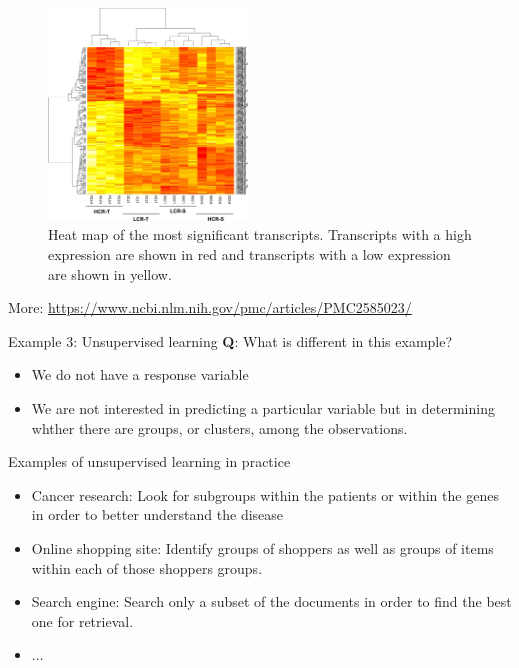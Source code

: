 \documentclass[
  10pt,
  ignorenonframetext,
]{beamer}
\providecommand{\tightlist}{%
  \setlength{\itemsep}{0pt}\setlength{\parskip}{0pt}}
\begin{document}
\begin{frame}
\begin{figure}
\includegraphics[width=150pt]{heatmap} \caption{Heat map of the most significant transcripts. Transcripts with a high expression are shown in red and transcripts with a low expression are shown in yellow.}\label{fig:heatmap_pic}
\end{figure}

\tiny

More: \url{https://www.ncbi.nlm.nih.gov/pmc/articles/PMC2585023/}
\end{frame}

\begin{frame}{Example 3: Unsupervised learning}
\protect\hypertarget{example-3-unsupervised-learning}{}
\textbf{Q}: What is different in this example?

\pause

\begin{itemize}
\tightlist
\item
  We do not have a response variable
\item
  We are not interested in predicting a particular variable but in
  determining whther there are groups, or clusters, among the
  observations.
\end{itemize}
\end{frame}

\begin{frame}{Examples of unsupervised learning in practice}
\protect\hypertarget{examples-of-unsupervised-learning-in-practice}{}
\begin{itemize}
\item
  Cancer research: Look for subgroups within the patients or within the
  genes in order to better understand the disease
\item
  Online shopping site: Identify groups of shoppers as well as groups of
  items within each of those shoppers groups.
\item
  Search engine: Search only a subset of the documents in order to find
  the best one for retrieval.
\item
  \(\dots\)
\end{itemize}
\end{frame}
\end{document}
